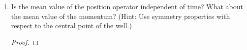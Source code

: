 \documentclass[../psets.tex]{subfiles}
\begin{document}
\begin{enumerate}
\begin{enumerate}
\begin{proof}
\begin{align*}
\begin{split}
                    &+\frac{1}{\sqrt{10}}\sqrt{\frac{2}{a}}\sin(\frac{5\pi x}{a})\e[-iE_5t/\hbar]
                \end{split}\\
                \Aboxed{\psi(x,t) ={}& \sqrt{\frac{6}{5a}}\sin(\frac{\pi x}{a})\e[-iE_1t/\hbar]+\sqrt{\frac{3}{5a}}\sin(\frac{3\pi x}{a})\e[-iE_3t/\hbar]+\frac{1}{\sqrt{5a}}\sin(\frac{5\pi x}{a})\e[-iE_5t/\hbar]}
            \end{align*}
        \end{proof}
        \item Is the mean value of the position operator independent of time? What about the mean value of the momentum? (Hint: Use symmetry properties with respect to the central point of the well.)
        \begin{proof}



\end{proof}
\end{enumerate}
\end{enumerate}
\end{document}
